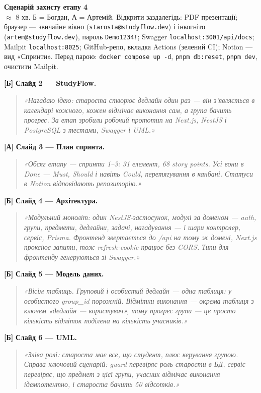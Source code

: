 \documentclass[11pt]{article}
\newcommand{\say}[1]{\begin{quote}\itshape «#1»\end{quote}}
\newcommand{\who}[1]{\textcolor{accent}{\textbf{[#1]}}}
\begin{document}
\setlength{\emergencystretch}{2em}

\begin{center}
{\LARGE\bfseries Сценарій захисту етапу 4}\\[3pt]
{\small $\approx$ 8 хв. Б = Богдан, А = Артемій. Відкрити заздалегідь: PDF презентації; браузер --- звичайне вікно (\texttt{starosta@studyflow.dev}) і інкогніто (\texttt{artem@studyflow.dev}), пароль \texttt{Demo1234!}; Swagger \texttt{localhost:3001/api/docs}; Mailpit \texttt{localhost:8025}; GitHub-репо, вкладка Actions (зелений CI); Notion --- вид «Спринти». Перед парою: \texttt{docker compose up -d}, \texttt{pnpm db:reset}, \texttt{pnpm dev}, очистити Mailpit.}
\end{center}

\who{Б} \textbf{Слайд 2 --- StudyFlow.}
\say{Нагадаю ідею: староста створює дедлайн один раз --- він з'являється в календарі кожного, кожен відмічає виконання сам, а група бачить прогрес. За етап зробили робочий прототип на Next.js, NestJS і PostgreSQL з тестами, Swagger і UML.}

\who{А} \textbf{Слайд 3 --- План спринта.}
\say{Обсяг етапу --- спринти 1--3: 31 елемент, 68 story points. Усі вони в Done --- Must, Should і навіть Could, перетягування в канбані. Статуси в Notion відповідають репозиторію.}

\who{Б} \textbf{Слайд 4 --- Архітектура.}
\say{Модульний моноліт: один NestJS-застосунок, модулі за доменом --- auth, групи, предмети, дедлайни, задачі, нагадування --- і шари контролер, сервіс, Prisma. Фронтенд звертається до /api на тому ж домені, Next.js проксіює запити, тож refresh-cookie працює без CORS. Типи для фронтенду генеруються зі Swagger.}

\who{Б} \textbf{Слайд 5 --- Модель даних.}
\say{Вісім таблиць. Груповий і особистий дедлайн --- одна таблиця: у особистого group\_id порожній. Відмітки виконання --- окрема таблиця з ключем «дедлайн --- користувач», тому прогрес групи --- це просто кількість відміток поділена на кількість учасників.}

\who{Б} \textbf{Слайд 6 --- UML.}
\say{Зліва ролі: староста має все, що студент, плюс керування групою. Справа ключовий сценарій: guard перевіряє роль старости в БД, сервіс перевіряє, що предмет з цієї групи, учасник відмічає виконання ідемпотентно, і староста бачить 50 відсотків.}
\end{document}
